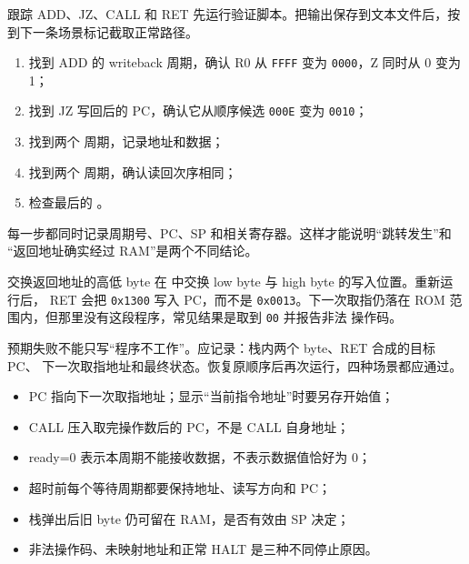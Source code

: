 \begin{experimentbox}{跟踪 ADD、JZ、CALL 和 RET}
先运行验证脚本。把输出保存到文本文件后，按
 到下一条场景标记截取正常路径。

\begin{enumerate}[leftmargin=2.2em]
  \item 找到 ADD 的 writeback 周期，确认 R0 从 \texttt{FFFF} 变为
    \texttt{0000}，Z 同时从 0 变为 1；
  \item 找到 JZ 写回后的 PC，确认它从顺序候选
    \texttt{000E} 变为 \texttt{0010}；
  \item 找到两个  周期，记录地址和数据；
  \item 找到两个  周期，确认读回次序相同；
  \item 检查最后的 。
\end{enumerate}

每一步都同时记录周期号、PC、SP 和相关寄存器。这样才能说明“跳转发生”和
“返回地址确实经过 RAM”是两个不同结论。
\end{experimentbox}

\begin{faultinjectionbox}{交换返回地址的高低 byte}
在  中交换 low byte 与 high byte 的写入位置。重新运行后，
RET 会把 \texttt{0x1300} 写入 PC，而不是 \texttt{0x0013}。下一次取指仍落在
ROM 范围内，但那里没有这段程序，常见结果是取到 \texttt{00} 并报告非法
操作码。

预期失败不能只写“程序不工作”。应记录：栈内两个 byte、RET 合成的目标 PC、
下一次取指地址和最终状态。恢复原顺序后再次运行，四种场景都应通过。
\end{faultinjectionbox}

\begin{pitfallbox}
\begin{itemize}[leftmargin=2.2em]
  \item PC 指向下一次取指地址；显示“当前指令地址”时要另存开始值；
  \item CALL 压入取完操作数后的 PC，不是 CALL 自身地址；
  \item ready=0 表示本周期不能接收数据，不表示数据值恰好为 0；
  \item 超时前每个等待周期都要保持地址、读写方向和 PC；
  \item 栈弹出后旧 byte 仍可留在 RAM，是否有效由 SP 决定；
  \item 非法操作码、未映射地址和正常 HALT 是三种不同停止原因。
\end{itemize}
\end{pitfallbox}

